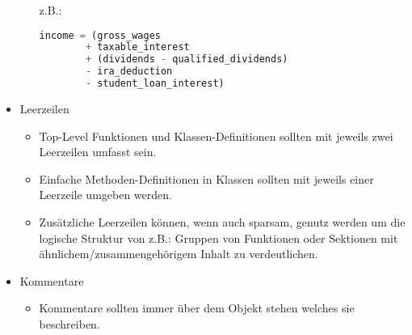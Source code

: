 \begin{itemize}
\begin{itemize}
z.B.: 
\begin{lstlisting}[language=python]
income = (gross_wages
        + taxable_interest
        + (dividends - qualified_dividends)
        - ira_deduction
        - student_loan_interest)
\end{lstlisting}
\end{itemize}
\item Leerzeilen
\begin{itemize}
\item Top-Level Funktionen und Klassen-Definitionen sollten mit jeweils zwei Leerzeilen umfasst sein.
\item Einfache Methoden-Definitionen in Klassen sollten mit jeweils einer Leerzeile umgeben werden.
\item Zusätzliche Leerzeilen können, wenn auch sparsam, genutz werden um die logische Struktur von z.B.: Gruppen von Funktionen oder Sektionen mit ähnlichem/zusammengehörigem Inhalt zu verdeutlichen.
\end{itemize}
\item Kommentare
\begin{itemize}
\item Kommentare sollten immer über dem Objekt stehen welches sie beschreiben.
\end{itemize}
\end{itemize}

